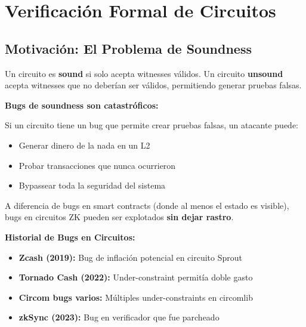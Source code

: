 \documentclass[11pt,a4paper,twoside]{book}
\begin{document}
\section{Verificaci\'on Formal de Circuitos}
\label{sec:formal-verification}

\subsection{Motivaci\'on: El Problema de Soundness}

\begin{definition}
Un circuito es \textbf{sound} si solo acepta witnesses v\'alidos. Un circuito \textbf{unsound} acepta witnesses que no deber\'ian ser v\'alidos, permitiendo generar pruebas falsas.
\end{definition}

\begin{remark}
\textbf{Bugs de soundness son catastr\'oficos:}

Si un circuito tiene un bug que permite crear pruebas falsas, un atacante puede:
\begin{itemize}
    \item Generar dinero de la nada en un L2
    \item Probar transacciones que nunca ocurrieron
    \item Bypassear toda la seguridad del sistema
\end{itemize}

A diferencia de bugs en smart contracts (donde al menos el estado es visible), bugs en circuitos ZK pueden ser explotados \textbf{sin dejar rastro}.
\end{remark}

\begin{mathnote}
\textbf{Historial de Bugs en Circuitos:}
\begin{itemize}
    \item \textbf{Zcash (2019):} Bug de inflaci\'on potencial en circuito Sprout
    \item \textbf{Tornado Cash (2022):} Under-constraint permit\'ia doble gasto
    \item \textbf{Circom bugs varios:} M\'ultiples under-constraints en circomlib
    \item \textbf{zkSync (2023):} Bug en verificador que fue parcheado
\end{itemize}
\end{mathnote}
\end{document}
